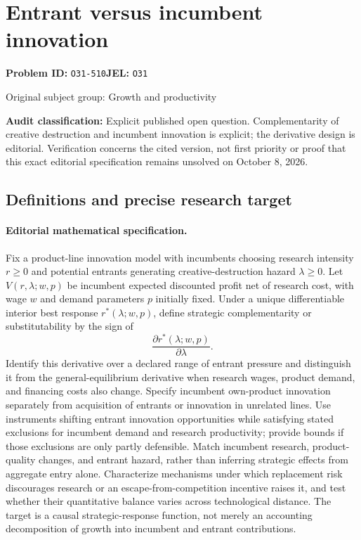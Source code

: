 \documentclass[11pt,a4paper]{article}
\begin{document}
\section*{Entrant versus incumbent innovation}
\textbf{Problem ID:} \texttt{O31-510}\quad \textbf{JEL:} \texttt{O31}\par
\label{problem:OP-0266}
{\sffamily\small\color{muted}Original subject group: Growth and productivity\par}
\label{definitions:problem:30007547}
\textbf{Audit classification:} Explicit published open question. Complementarity of creative destruction and incumbent innovation is explicit; the derivative design is editorial. Verification concerns the cited version, not first priority or proof that this exact editorial specification remains unsolved on October 8, 2026.
\subsection*{Definitions and precise research target}
\paragraph{Editorial mathematical specification.} Fix a product-line innovation model with incumbents choosing research intensity \(r\ge0\) and potential entrants generating creative-destruction hazard \(\lambda\ge0\). Let \(V(r,\lambda;w,p)\) be incumbent expected discounted profit net of research cost, with wage \(w\) and demand parameters \(p\) initially fixed. Under a unique differentiable interior best response \(r^*(\lambda;w,p)\), define strategic complementarity or substitutability by the sign of
\[
\frac{\partial r^*(\lambda;w,p)}{\partial\lambda}.
\]
Identify this derivative over a declared range of entrant pressure and distinguish it from the general-equilibrium derivative when research wages, product demand, and financing costs also change. Specify incumbent own-product innovation separately from acquisition of entrants or innovation in unrelated lines.
Use instruments shifting entrant innovation opportunities while satisfying stated exclusions for incumbent demand and research productivity; provide bounds if those exclusions are only partly defensible. Match incumbent research, product-quality changes, and entrant hazard, rather than inferring strategic effects from aggregate entry alone. Characterize mechanisms under which replacement risk discourages research or an escape-from-competition incentive raises it, and test whether their quantitative balance varies across technological distance. The target is a causal strategic-response function, not merely an accounting decomposition of growth into incumbent and entrant contributions.
\end{document}
